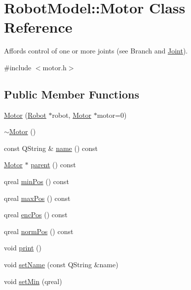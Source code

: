 \hypertarget{class_robot_model_1_1_motor}{
\section{RobotModel::Motor Class Reference}
\label{class_robot_model_1_1_motor}
}


Affords control of one or more joints (see Branch and \hyperlink{class_robot_model_1_1_joint}{Joint}).  


{\ttfamily \#include $<$motor.h$>$}\subsection*{Public Member Functions}
\begin{DoxyCompactItemize}
\item 
\hyperlink{class_robot_model_1_1_motor_afa8d3bb8b2ad45bdc8064efa0052dd04}{Motor} (\hyperlink{class_robot_model_1_1_robot}{Robot} $\ast$robot, \hyperlink{class_robot_model_1_1_motor}{Motor} $\ast$motor=0)
\item 
\hyperlink{class_robot_model_1_1_motor_a2e57c7b2681efea1d3b7f253ee88ecd4}{$\sim$Motor} ()
\item 
const QString \& \hyperlink{class_robot_model_1_1_motor_a35eeb7f97a9339ee23c0689af2463c17}{name} () const 
\item 
\hyperlink{class_robot_model_1_1_motor}{Motor} $\ast$ \hyperlink{class_robot_model_1_1_motor_a31de5801eb1a089723a7f6980baff4a2}{parent} () const 
\item 
qreal \hyperlink{class_robot_model_1_1_motor_af2cc406d7443e2cf350408d12b8e544b}{minPos} () const 
\item 
qreal \hyperlink{class_robot_model_1_1_motor_abd6baf3a9ae74dcf970663e5ee303131}{maxPos} () const 
\item 
qreal \hyperlink{class_robot_model_1_1_motor_a8f95b65d6bf72038a4aca3a394609354}{encPos} () const 
\item 
qreal \hyperlink{class_robot_model_1_1_motor_a99de4f0e475ec8bea35fa3977fa8731f}{normPos} () const 
\item 
void \hyperlink{class_robot_model_1_1_motor_a35ae467be2d96ea6acca0860e5bda22f}{print} ()
\item 
void \hyperlink{class_robot_model_1_1_motor_a9efaa43179205b53df370f7811023eb6}{setName} (const QString \&name)
\item 
void \hyperlink{class_robot_model_1_1_motor_a404e359dac5e3af43860948d9e35f725}{setMin} (qreal)
\item 

\end{DoxyCompactItemize}
